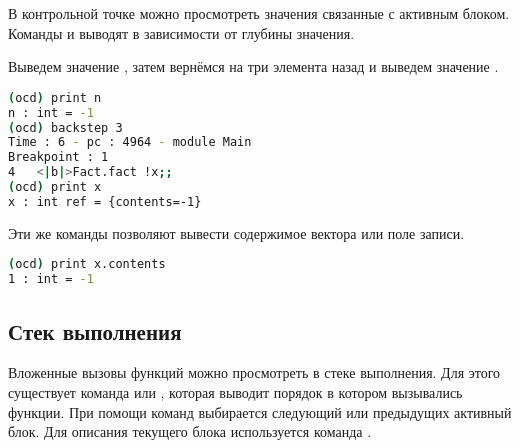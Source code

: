 В контрольной точке можно просмотреть значения связанные с активным блоком. 
Команды  и  выводят в зависимости от глубины значения.

Выведем значение , затем вернёмся на три элемента назад и выведем 
значение .

\begin{lstlisting}[language=Bash]
(ocd) print n
n : int = -1
(ocd) backstep 3    
Time : 6 - pc : 4964 - module Main
Breakpoint : 1
4   <|b|>Fact.fact !x;;
(ocd) print x
x : int ref = {contents=-1}
\end{lstlisting}

Эти же команды позволяют вывести содержимое вектора или поле записи.

\begin{lstlisting}[language=Bash]
(ocd) print x.contents
1 : int = -1
\end{lstlisting}

\subsection {Стек выполнения}
\label{subsubsec:execution_stack}

Вложенные вызовы функций можно просмотреть в стеке выполнения. Для этого 
существует команда  или , которая выводит порядок в 
котором вызывались функции. При помощи команд  выбирается 
следующий или предыдущих активный блок. Для описания текущего блока используется 
команда .
